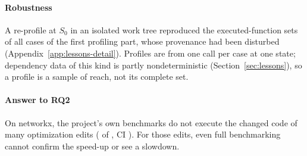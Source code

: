 \paragraph*{Robustness}
A re-profile at $S_0$ in an isolated work tree reproduced the executed-function sets of all \ReprofileCases{} cases of the first profiling part, whose provenance had been disturbed (Appendix~\ref{app:lessons-detail}).
Profiles are from one call per case at one state; dependency data of this kind is partly nondeterministic (Section~\ref{sec:lessons}), so a profile is a sample of reach, not its complete set.

\paragraph*{Answer to RQ2}
On networkx, the project's own benchmarks do not execute the changed code of many optimization edits (\BOneAgentUnreached{} of \NxAgentOpt{}, CI \ci{\BOneAgentLo}{\BOneAgentHi}).
For those edits, even full benchmarking cannot confirm the speed-up or see a slowdown.
